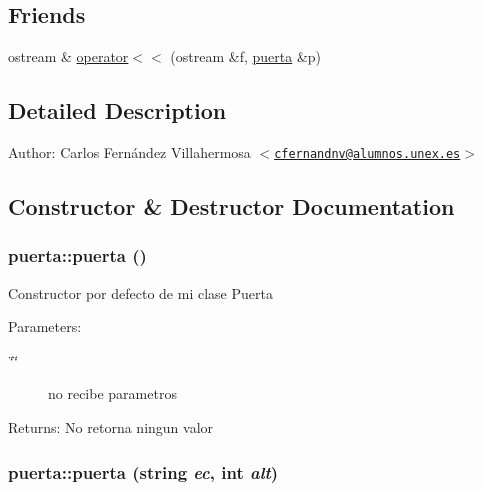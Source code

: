\subsection*{Friends}
\begin{CompactItemize}
\item 
ostream \& \hyperlink{classpuerta_490c20cc328bef002a79831d7d649b47}{operator$<$$<$} (ostream \&f, \hyperlink{classpuerta}{puerta} \&p)
\end{CompactItemize}


\subsection{Detailed Description}
\begin{Desc}
\item[Author:]Carlos Fernández Villahermosa $<$\href{mailto:cfernandnv@alumnos.unex.es}{\tt cfernandnv@alumnos.unex.es}$>$ \end{Desc}


\subsection{Constructor \& Destructor Documentation}
\hypertarget{classpuerta_dae189c1b2be845ba10b3335e4c3b91d}{
\subsubsection[puerta]{\setlength{\rightskip}{0pt plus 5cm}puerta::puerta ()}}
\label{classpuerta_dae189c1b2be845ba10b3335e4c3b91d}


Constructor por defecto de mi clase Puerta \begin{Desc}
\item[Parameters:]
\begin{description}
\item[{\em \char`\"{}\char`\"{}}]no recibe parametros \end{description}
\end{Desc}
\begin{Desc}
\item[Returns:]No retorna ningun valor \end{Desc}
\hypertarget{classpuerta_237f56c4736c97891edb19aeee750ed2}{
\subsubsection[puerta]{\setlength{\rightskip}{0pt plus 5cm}puerta::puerta (string {\em ec}, \/  int {\em alt})}}
\label{classpuerta_237f56c4736c97891edb19aeee750ed2}


